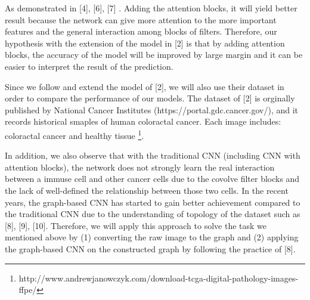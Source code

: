 \documentclass[letterpaper, 11 pt, journal]{ieeeconf}
\begin{document}
	As demonstrated in [4], [6], [7] . Adding the attention blocks, it will yield better result because the network can give more 
	attention to the more important features and the general interaction among blocks of filters. 
	Therefore, our hypothesis with the extension of the model in [2] is that by adding attention blocks, the accuracy of the model will be improved by large margin and 
	it can be easier to interpret the result of the prediction.

	Since we follow and extend the model of [2], we will also use their dataset in order to compare the performance of our models. The dataset of [2] is orginally 
	published by National Cancer Institutes (https://portal.gdc.cancer.gov/), and it records historical smaples of human coloractal cancer. Each image includes: coloractal cancer and healthy tissue
	\footnote{http://www.andrewjanowczyk.com/download-tcga-digital-pathology-images-ffpe/}.
	
	In addition, we also observe that with the traditional CNN (including CNN with attention blocks), the network does not strongly learn the real 
	interaction between a immuse cell and other cancer cells due to the covolve filter blocks and the lack of well-defined the relationship between 
	those two cells.  In the recent years, the graph-based CNN has started to gain better achievement compared to the traditional CNN due to the understanding of topology of 
	the dataset such as [8], [9], [10]. Therefore, we will apply this approach to solve the task we mentioned above by (1) converting the raw image to the graph 
	and (2) applying the graph-based CNN on the constructed graph by following the practice of [8].

	
	\cleardoublepage
	
	
\end{document}
